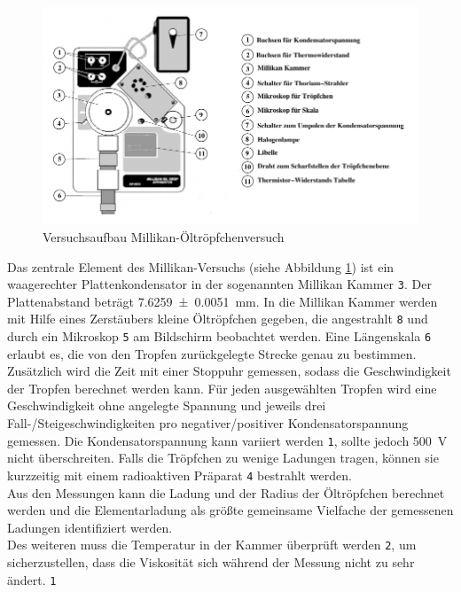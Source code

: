 \begin{figure}[h!]
	\centering
	\includegraphics[width=\textwidth]{Versuchsaufbau.png}
	\caption{Versuchsaufbau Millikan-Öltröpfchenversuch\footnotemark}
	\label{fig:versuchsaufbau}
\end{figure}


Das zentrale Element des Millikan-Versuchs (siehe Abbildung \ref{fig:versuchsaufbau}) ist ein waagerechter Plattenkondensator in der sogenannten Millikan Kammer {\large\textcircled{\normalsize \texttt{3}}}. Der Plattenabstand beträgt \SI{7.6259+-0.0051}{\milli\meter}. In die Millikan Kammer werden mit Hilfe eines Zerstäubers kleine Öltröpfchen gegeben, die angestrahlt {\large\textcircled{\normalsize \texttt{8}}} und durch ein Mikroskop {\large\textcircled{\normalsize \texttt{5}}} am Bildschirm beobachtet werden. Eine Längenskala {\large\textcircled{\normalsize \texttt{6}}} erlaubt es, die von den Tropfen zurückgelegte Strecke genau zu bestimmen. Zusätzlich wird die Zeit mit einer Stoppuhr gemessen, sodass die Geschwindigkeit der Tropfen berechnet werden kann. Für jeden ausgewählten Tropfen wird eine Geschwindigkeit ohne angelegte Spannung und jeweils drei Fall-/Steigeschwindigkeiten pro negativer/positiver Kondensatorspannung gemessen. Die Kondensatorspannung kann variiert werden {\large\textcircled{\normalsize \texttt{1}}}, sollte jedoch \SI{500}{\volt} nicht überschreiten. Falls die Tröpfchen zu wenige Ladungen tragen, können sie kurzzeitig mit einem radioaktiven Präparat {\large\textcircled{\normalsize \texttt{4}}} bestrahlt werden. \\
Aus den Messungen kann die Ladung und der Radius der Öltröpfchen berechnet werden und die Elementarladung als größte gemeinsame Vielfache der gemessenen Ladungen identifiziert werden. \\
Des weiteren muss die Temperatur in der Kammer überprüft werden {\large\textcircled{\normalsize \texttt{2}}}, um sicherzustellen, dass die Viskosität sich während der Messung nicht zu sehr ändert.
{\large\textcircled{\normalsize \texttt{1}}}